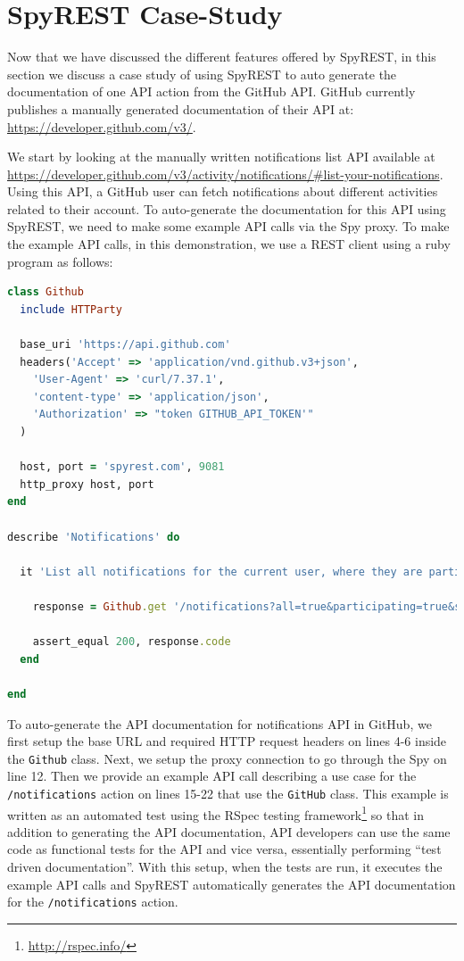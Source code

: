 \documentclass[conference]{IEEEtran}
\begin{document}
\section{SpyREST Case-Study}
Now that we have discussed the different features offered by SpyREST, in this section we discuss a case study of using SpyREST to auto generate the documentation of one API action from the GitHub API. GitHub currently publishes a manually generated documentation of their API at: \url{https://developer.github.com/v3/}.

We start by looking at the manually written notifications list API available at \url{https://developer.github.com/v3/activity/notifications/#list-your-notifications}. Using this API, a GitHub user can fetch notifications about different activities related to their account. To auto-generate the documentation for this API using SpyREST, we need to make some example API calls via the Spy proxy. To make the example API calls, in this demonstration, we use a REST client using a ruby program as follows:

\lstset{showstringspaces=false, basicstyle=\footnotesize, numbers=left, numbersep=1pt }
\begin{lstlisting}[language=ruby, breaklines=true, caption={}, label=list:ex]
class Github
  include HTTParty

  base_uri 'https://api.github.com'
  headers('Accept' => 'application/vnd.github.v3+json',
    'User-Agent' => 'curl/7.37.1',
    'content-type' => 'application/json',
    'Authorization' => "token GITHUB_API_TOKEN'"
  )

  host, port = 'spyrest.com', 9081
  http_proxy host, port
end

describe 'Notifications' do

  it 'List all notifications for the current user, where they are participating, since a time' do

    response = Github.get '/notifications?all=true&participating=true&since=2014-01-01T00:00:00Z'

    assert_equal 200, response.code
  end

end\end{lstlisting}

To auto-generate the API documentation for notifications API in GitHub, we first setup the base URL and required HTTP request headers on lines 4-6 inside the \texttt{Github} class. Next, we setup the proxy connection to go through the Spy on line 12. Then we provide an example API call describing a use case for the \texttt{/notifications} action on lines 15-22 that use the \texttt{GitHub} class. This example is written as an automated test using the RSpec testing framework\footnote{\url{http://rspec.info/}} so that in addition to generating the API documentation, API developers can use the same code as functional tests for the API and vice versa, essentially performing ``test driven documentation''. With this setup, when the tests are run, it executes the example API calls and SpyREST automatically generates the API documentation for the \texttt{/notifications} action.
\end{document}
